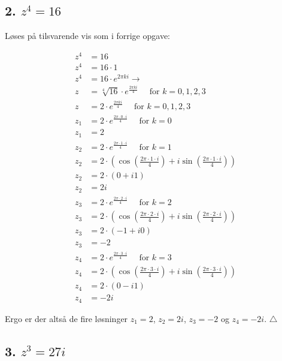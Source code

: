 \documentclass[a4paper, 12pt]{article}
\begin{document}
\subsection*{2. \(z^4=16\)}
\label{sec:org14f9793}

Løses på tilsvarende vis som i forrige opgave:

\begin{align*}
    z^4 &= 16 \\
    z^4 &= 16 \cdot 1 \\
    z^4 &= 16 \cdot e^{2 \pi k i} \to \\
    z   &= \sqrt[4]{16} \cdot e^{\frac{2 \pi k i}{4}} \quad \text{ for } k=0,1,2,3 \\
    z   &= 2 \cdot e^{\frac{2 \pi k i}{4}} \quad \text{ for } k=0,1,2,3 \\
    z_1   &= 2 \cdot e^{\frac{2 \pi \cdot 0 \cdot i}{4}} \quad \text{ for } k=0 \\
    z_1   &= 2 \\
    z_2   &= 2 \cdot e^{\frac{2 \pi \cdot 1 \cdot i}{4}} \quad \text{ for } k=1 \\
    z_2   &= 2 \cdot \left(\cos\left(\frac{2 \pi \cdot 1 \cdot i}{4}\right) + i \sin\left(\frac{2 \pi \cdot 1 \cdot i}{4} \right) \right) \\
    z_2   &= 2 \cdot \left(0 + i 1 \right) \\
    z_2   &= 2i \\
    z_3   &= 2 \cdot e^{\frac{2 \pi \cdot 2 \cdot i}{4}} \quad \text{ for } k=2 \\
    z_3   &= 2 \cdot \left(\cos\left(\frac{2 \pi \cdot 2 \cdot i}{4}\right) + i \sin\left(\frac{2 \pi \cdot 2 \cdot i}{4} \right) \right) \\
    z_3   &= 2 \cdot \left(-1 + i 0 \right) \\
    z_3   &= -2 \\
    z_4   &= 2 \cdot e^{\frac{2 \pi \cdot 3 \cdot i}{4}} \quad \text{ for } k=3 \\
    z_4   &= 2 \cdot \left(\cos\left(\frac{2 \pi \cdot 3 \cdot i}{4}\right) + i \sin\left(\frac{2 \pi \cdot 3 \cdot i}{4} \right) \right) \\
    z_4   &= 2 \cdot \left(0 - i 1 \right) \\
    z_4   &= -2i 
\end{align*}

Ergo er der altså de fire løsninger \(z_1=2\), \(z_2=2i\), \(z_3=-2\) og \(z_4 = -2i\). \(\triangle\)

\subsection*{3. \(z^3 = 27 i\)}
\label{sec:org69ea70b}
\end{document}
